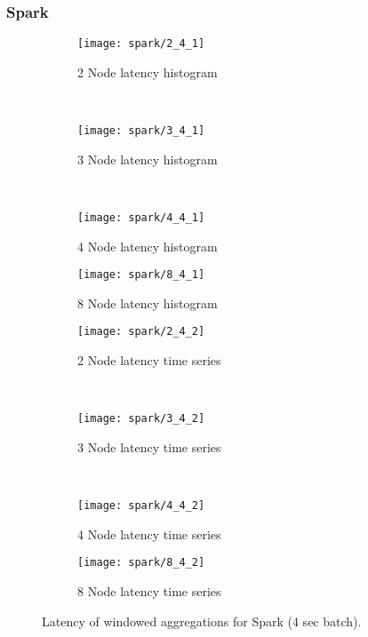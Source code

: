 \subsubsection{Spark}



\begin{figure*}
    \centering
    \begin{subfigure}[b]{0.49\textwidth}
        \texttt{[image: spark/2\_4\_1]}
        \caption{2 Node latency histogram}
        \label{fig_no_queue}
    \end{subfigure}
    ~ %
    \begin{subfigure}[b]{0.49\textwidth}
        \texttt{[image: spark/3\_4\_1]}
        \caption{3 Node latency histogram}
        \label{fig_yes_queue}
    \end{subfigure}
    ~ %
    \begin{subfigure}[b]{0.49\textwidth}
        \texttt{[image: spark/4\_4\_1]}
        \caption{4 Node latency histogram}
        \label{fig_partial_queue}
    \end{subfigure}
        \begin{subfigure}[b]{0.49\textwidth}
        \texttt{[image: spark/8\_4\_1]}
        \caption{8 Node latency histogram}
        \label{fig_partial_queue}
    \end{subfigure}


    \begin{subfigure}[b]{0.49\textwidth}
        \texttt{[image: spark/2\_4\_2]}
        \caption{2 Node latency time series}
        \label{fig_no_queue}
    \end{subfigure}
    ~ %
    \begin{subfigure}[b]{0.49\textwidth}
        \texttt{[image: spark/3\_4\_2]}
        \caption{3 Node latency time series}
        \label{fig_yes_queue}
    \end{subfigure}
    ~ %
    \begin{subfigure}[b]{0.49\textwidth}
        \texttt{[image: spark/4\_4\_2]}
        \caption{4 Node latency time series}
        \label{fig_partial_queue}
    \end{subfigure}
        \begin{subfigure}[b]{0.49\textwidth}
        \texttt{[image: spark/8\_4\_2]}
        \caption{8 Node latency time series}
        \label{fig_partial_queue}
    \end{subfigure}

    \label{fig_flink_agg_1}
        \caption{Latency of windowed aggregations for Spark (4 sec batch).}
\end{figure*}
